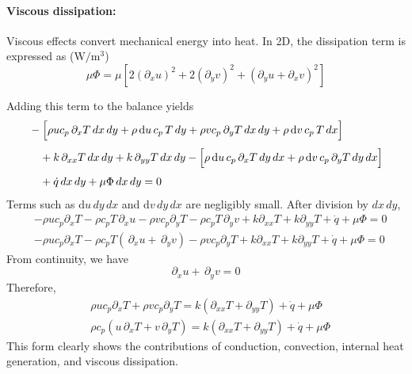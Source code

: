 \paragraph{Viscous dissipation:}
Viscous effects convert mechanical energy into heat. In 2D, the dissipation term is expressed as ($\mathrm{W/m^3}$)
%
\[
\mu\Phi
= \mu\!\left[
  2\!\left(\partial_x u\right)^{2}
  + 2\!\left(\partial_y v\right)^{2}
  + \left(\partial_y u + \partial_x v\right)^{2}
\right]
\]

Adding this term to the balance yields
\[
    \begin{aligned}
    &-\Bigl[
      \rho u c_p \,\partial_x T \,dx\,dy
      + \rho\,\mathrm{d}u\,c_p\,T\,dy
      + \rho v c_p \,\partial_y T \,dx\,dy
      + \rho\,\mathrm{d}v\,c_p\,T\,dx
    \Bigr] 
    \\[0.3em]
    &\quad
    + k \,\partial_{xx} T \,dx\,dy
    + k \,\partial_{yy} T \,dx\,dy
    -\Bigl[
      \rho\,\mathrm{d}u\,c_p\,\partial_x T \,dy\,dx
      + \rho\,\mathrm{d}v\,c_p\,\partial_y T \,dy\,dx
    \Bigr] \\[0.3em]
    &\quad
    + \dot{q}\,dx\,dy
    + \mu\Phi\,dx\,dy
    =0 
    \end{aligned}
\]
%
Terms such as \(\mathrm{d}u\,dy\,dx\) and \(\mathrm{d}v\,dy\,dx\) are negligibly small.  
After division by \(dx\,dy\),
\[
\begin{aligned}
    &-\rho u c_p \partial_x T
    -\rho c_p T\,\partial_x u
    -\rho v c_p \partial_y T
    -\rho c_p T\,\partial_y v
    +k\partial_{xx} T
    +k\partial_{yy} T
    +\dot{q}
    +\mu\Phi
    =0
    \\[1em]
    &-\rho u c_p \partial_x T
    -\rho c_p T (\,\partial_x u + \,\partial_y v)
    -\rho v c_p \partial_y T
    +k\partial_{xx} T
    +k\partial_{yy} T
    +\dot{q}
    +\mu\Phi
    =0
\end{aligned}
\]
%
From continuity, we have
\[
    \partial_x u + \,\partial_y v = 0
\]
Therefore,
\[
    \begin{aligned}
    &    \rho u c_p \partial_x T
    + \rho v c_p \partial_y T
    = k\left(\partial_{xx} T + \partial_{yy} T\right)
    + \dot{q}
    + \mu\Phi
    \\[1em]
    & \boxed{\rho c_p 
    (u\,\partial_x T
    + v\,\partial_y T)
    = k\left(\partial_{xx} T + \partial_{yy} T\right)
    + \dot{q}
    + \mu\Phi
    }
    \end{aligned}
\]
This form clearly shows the contributions of conduction, convection, internal heat generation, and viscous dissipation.

